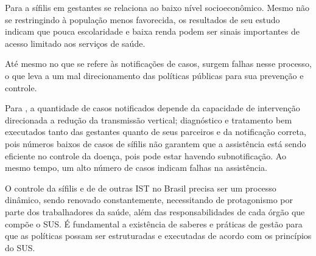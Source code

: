 Para \cite{cad2013} a sífilis em gestantes se relaciona ao baixo nível socioeconômico. Mesmo não se restringindo à população menos favorecida, os resultados de seu estudo indicam que pouca escolaridade e baixa renda podem ser sinais importantes de acesso limitado aos serviços de  saúde.

Até mesmo no que se refere às notificações de casos, surgem falhas nesse processo, o que leva a um mal direcionamento das políticas públicas para sua prevenção e controle. 

Para \cite{domingues2016incidencia},  a quantidade de casos notificados depende da capacidade de intervenção direcionada a redução da transmissão vertical; diagnóstico e tratamento bem executados tanto das gestantes quanto de seus parceiros e da notificação correta, pois números baixos de casos de sífilis não garantem que a assistência está sendo eficiente no controle da doença, pois pode estar havendo subnotificação. Ao mesmo tempo, um alto número de casos indicam falhas na assistência.

O controle da sífilis e de de outras IST no Brasil precisa ser um processo dinâmico, sendo renovado constantemente, necessitando de protagonismo por parte dos trabalhadores da saúde, além das responsabilidades de cada órgão que compõe o SUS. É fundamental a existência de saberes e práticas de gestão para que as políticas possam ser estruturadas e executadas de acordo com os princípios do SUS. \cite{brasil2015protocolo}

